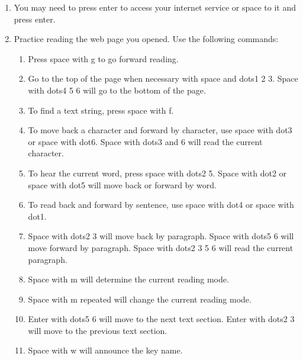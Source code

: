 \documentclass[10pt,letterpaper,twoside]{report}
\begin{document}
{{{{\begin{enumerate}
	\item You may need to press enter to access your internet service or space to it and press enter.
	      
	\item Practice reading the web page you opened.  Use the following commands:
	      
	      \begin{enumerate}
		      \item Press space with g to go forward reading.
		            
		      \item Go to the top of the page when necessary with space and dots1 2 3.  Space with dots4 5 6 will go to the bottom of the page.
		            
		      \item To find a text string, press space with f.
		            
		      \item To move back a character and forward by character, use space with dot3 or space with dot6. Space with dots3 and 6 will read the current character.
		            
		      \item To hear the current word, press space with dots2 5.  Space with dot2 or space with dot5 will move back or forward by word.
		            
		      \item To read back and forward by sentence, use space with dot4 or space with dot1.
		            
		      \item Space with dots2 3 will move back by paragraph.  Space with dots5 6 will move forward by paragraph.  Space with dots2 3 5 6 will read the current paragraph.
		            
		      \item Space with m will determine the current reading mode.
		            
		      \item Space with m repeated will change the current reading mode.
		            
		      \item Enter with dots5 6 will move to the next text section.  Enter with dots2 3 will move to the previous text section.
		            
		      \item Space with w will announce the key name.
		            

\end{enumerate}
\end{enumerate}}}}}
\end{document}

